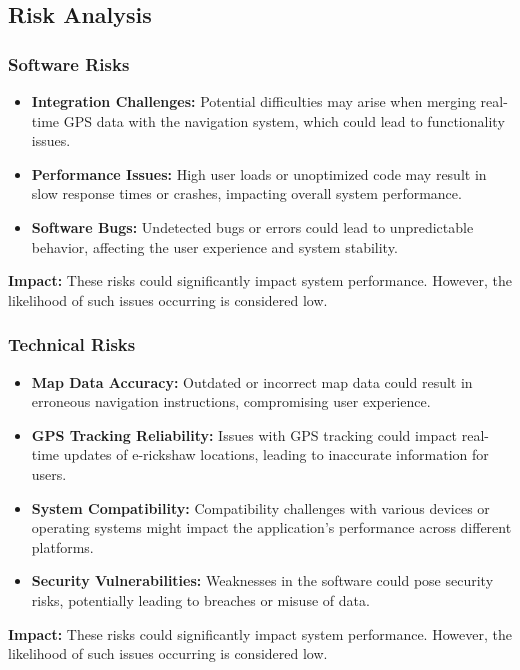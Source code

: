 \subsection{Risk Analysis}

\subsubsection*{Software Risks}
\begin{itemize}
	\item \textbf{Integration Challenges:} Potential difficulties may arise when merging real-time GPS data with the navigation system, which could lead to functionality issues.
	\item \textbf{Performance Issues:} High user loads or unoptimized code may result in slow response times or crashes, impacting overall system performance.
	\item \textbf{Software Bugs:} Undetected bugs or errors could lead to unpredictable behavior, affecting the user experience and system stability.
\end{itemize}
\textbf{Impact:} These risks could significantly impact system performance. However, the likelihood of such issues occurring is considered low.

\subsubsection*{Technical Risks}
\begin{itemize}
	\item \textbf{Map Data Accuracy:} Outdated or incorrect map data could result in erroneous navigation instructions, compromising user experience.
	\item \textbf{GPS Tracking Reliability:} Issues with GPS tracking could impact real-time updates of e-rickshaw locations, leading to inaccurate information for users.
	\item \textbf{System Compatibility:} Compatibility challenges with various devices or operating systems might impact the application's performance across different platforms.
	\item \textbf{Security Vulnerabilities:} Weaknesses in the software could pose security risks, potentially leading to breaches or misuse of data.
\end{itemize}
\textbf{Impact:} These risks could significantly impact system performance. However, the likelihood of such issues occurring is considered low.
